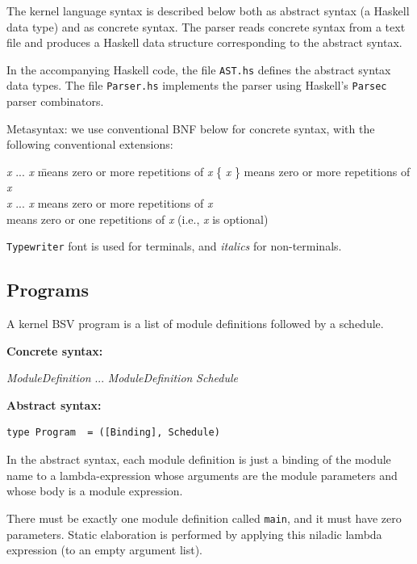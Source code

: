 \documentclass[11pt]{article}
\newcommand{\hm}{\hspace*{1em}}
\newcommand{\hmm}{\hspace*{2em}}
\newcommand{\nterm}[1]{\emph{#1}}
\newcommand{\term}[1]{\texttt{#1}}
\newcommand{\many}[2]{#1 #2 ... #2 #1}
\newcommand{\gram}[2]{    \hm\makebox[10em][l]{\it #1}\makebox[1.5em][l]{::=}    #2}
\begin{document}
\label{sec_syntax}

The kernel language syntax is described below both as abstract syntax
(a Haskell data type) and as concrete syntax.  The parser reads concrete syntax from
a text file and produces a Haskell data structure corresponding to the
abstract syntax.

In the accompanying Haskell code, the file {\tt AST.hs} defines the
abstract syntax data types.  The file {\tt Parser.hs} implements the
parser using Haskell's \term{Parsec} parser combinators.

Metasyntax: we use conventional BNF below for concrete syntax, with
the following conventional extensions:
\begin{tabbing}
\hmm \= \emph{x} ... \emph{x} \hm \= means zero or more repetitions of \emph{x} \kill
\hmm \> \{ \emph{x} \}            \> means zero or more repetitions of \emph{x} \\
\hmm \> \emph{x} ... \emph{x}     \> means zero or more repetitions of \emph{x} \\
\hmm \> [  \emph{x} ]             \> means zero or one repetitions of \emph{x} (i.e., \emph{x} is optional)
\end{tabbing}

\term{Typewriter} font is used for terminals, and \nterm{italics} for non-terminals.


\subsection{Programs}

A kernel BSV program is a list of module definitions followed by a
schedule.

{\bf Concrete syntax:}

\gram{Program}{\many{\nterm{ModuleDefinition}}{\hm} \nterm{Schedule}}

{\bf Abstract syntax:}

\begin{Verbatim}[frame=single, commandchars=\\\{\}]
type Program  = ([Binding], Schedule)
\end{Verbatim}

In the abstract syntax, each module definition is just a binding of
the module name to a lambda-expression whose arguments are the module
parameters and whose body is a module expression.

There must be exactly one module definition called \term{main}, and it
must have zero parameters.  Static elaboration is performed by
applying this niladic lambda expression (to an empty argument list).
\end{document}
